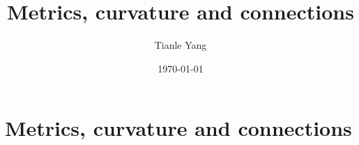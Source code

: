 \documentclass{noteformyself}
\title{Metrics, curvature and connections}
\author{Tianle Yang}
\date{\today}
\begin{document}
    \maketitle
    \section{Metrics, curvature and connections}




\end{document}
